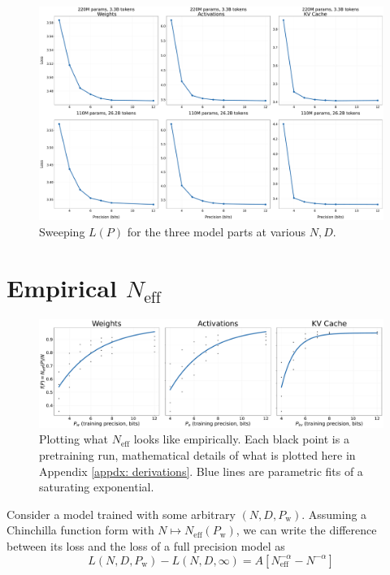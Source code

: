 \documentclass[11pt]{article}
\begin{document}
\begin{figure}
    \centering
    \includegraphics[width=\linewidth]{loss_grid_plot_new_evals.pdf} %
    \caption{Sweeping $L(P)$ for the three model parts at various $N, D$.}
    \label{fig:model-parts}
\end{figure}


\newpage 
\section{Empirical \texorpdfstring{$N_\text{eff}$}{}}
\label{appdx: empirical-neff}

\begin{figure}
    \centering
    \includegraphics[width=\linewidth]{N_eff_plot_empirical_Dolma_new_evals.pdf}%
    \caption{Plotting what $N_\text{eff}$ looks like empirically. Each black point is a pretraining run, mathematical details of what is plotted here in Appendix \ref{appdx: derivations}. Blue lines are parametric fits of a saturating exponential.} 
    \label{fig:neff-empirical}
\end{figure}

Consider a model trained with some arbitrary $(N, D, P_\text{w})$. Assuming a Chinchilla function form with $N \mapsto N_\text{eff}(P_\text{w})$, we can write the difference between its loss and the loss of a full precision model as 
$$L(N, D, P_\text{w}) - L(N, D, \infty) = A[N_\text{eff}^{-\alpha}-N^{-\alpha}]$$
\end{document}
